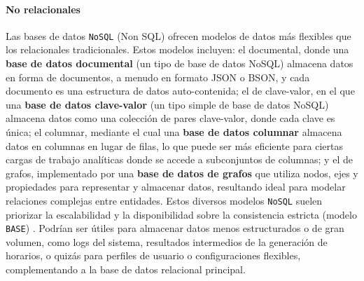\paragraph{No relacionales}
Las bases de datos \texttt{NoSQL} (Non SQL) ofrecen modelos de datos más flexibles que los relacionales tradicionales. Estos modelos incluyen:
el documental, donde una \textbf{base de datos documental} (un tipo de base de datos NoSQL) almacena datos en forma de documentos, a menudo en formato JSON o BSON, y cada documento es una estructura de datos auto-contenida;
el de clave-valor, en el que una \textbf{base de datos clave-valor} (un tipo simple de base de datos NoSQL) almacena datos como una colección de pares clave-valor, donde cada clave es única;
el columnar, mediante el cual una \textbf{base de datos columnar} almacena datos en columnas en lugar de filas, lo que puede ser más eficiente para ciertas cargas de trabajo analíticas donde se accede a subconjuntos de columnas;
y el de grafos, implementado por una \textbf{base de datos de grafos} que utiliza nodos, ejes y propiedades para representar y almacenar datos, resultando ideal para modelar relaciones complejas entre entidades.
Estos diversos modelos \texttt{NoSQL} suelen priorizar la escalabilidad y la disponibilidad sobre la consistencia estricta (modelo \texttt{BASE}) \parencite{SadalegeFowler2012}.
Podrían ser útiles para almacenar datos menos estructurados o de gran volumen, como logs del sistema, resultados intermedios de la generación de horarios, o quizás para perfiles de usuario o configuraciones flexibles, complementando a la base de datos relacional principal.
